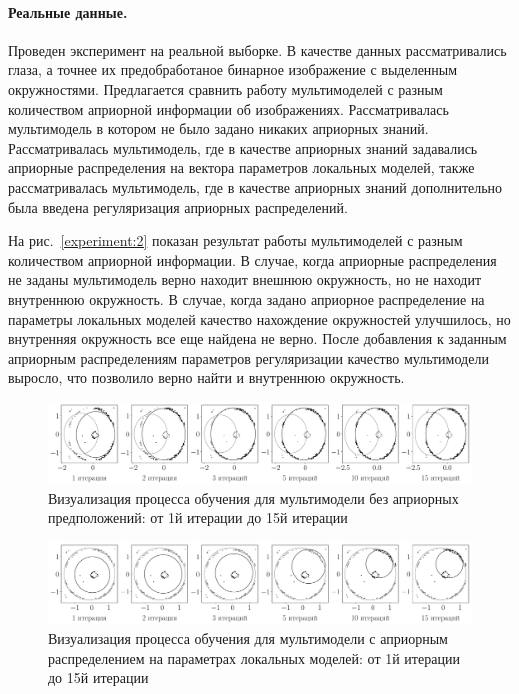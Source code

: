 \documentclass[12pt, twoside]{article}
\numberwithin{equation}{section}
\begin{document}
\paragraph{Реальные данные.}
Проведен эксперимент на реальной выборке. В качестве данных рассматривались глаза, а точнее их предобработаное бинарное изображение с выделенным окружностями. Предлагается сравнить работу мультимоделей с разным количеством априорной информации об изображениях. Рассматривалась мультимодель в котором не было задано никаких априорных знаний. Рассматривалась мультимодель, где в качестве априорных знаний задавались априорные распределения на вектора параметров локальных моделей, также рассматривалась мультимодель, где в качестве априорных знаний дополнительно была введена регуляризация априорных распределений.


На рис.~\ref{experiment:2} показан результат работы мультимоделей с разным количеством априорной информации. В случае, когда априорные распределения не заданы мультимодель верно находит внешнюю окружность, но не находит внутреннюю окружность. В случае, когда задано априорное распределение на параметры локальных моделей качество нахождение окружностей улучшилось, но внутренняя окружность все еще найдена не верно. После добавления к заданным априорным распределениям параметров регуляризации качество мультимодели выросло, что позволило верно найти и внутреннюю окружность.

\begin{figure}[h!t]\center
\includegraphics[width=1\textwidth]{result/experiment_real_not_prior}
\caption{Визуализация процесса обучения для мультимодели без априорных предположений: от 1й итерации до 15й итерации}
\label{experiment:3}
\end{figure}

\begin{figure}[h!t]\center
\includegraphics[width=1\textwidth]{result/experiment_real_prior}
\caption{Визуализация процесса обучения для мультимодели с априорным распределением на параметрах локальных моделей: от 1й итерации до 15й итерации}
\label{experiment:4}
\end{figure}
\end{document}
